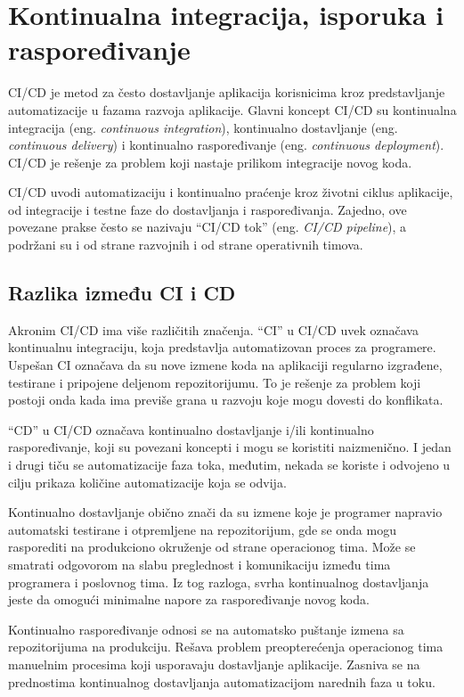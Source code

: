 \section{Kontinualna integracija, isporuka i raspoređivanje}\label{sec:arhitektura-ci_cd}

CI/CD je metod za često dostavljanje aplikacija korisnicima kroz predstavljanje automatizacije u 
fazama razvoja aplikacije. Glavni koncept CI/CD su kontinualna integracija (eng. 
\textit{continuous integration}), kontinualno dostavljanje (eng. \textit{continuous delivery}) i 
kontinualno raspoređivanje (eng. \textit{continuous deployment}). CI/CD je rešenje za problem 
koji nastaje prilikom integracije novog koda.

CI/CD uvodi automatizaciju i kontinualno praćenje kroz životni ciklus aplikacije, 
od integracije i testne faze do dostavljanja i raspoređivanja. Zajedno, ove povezane prakse 
često se nazivaju “CI/CD tok” (eng. \textit{CI/CD pipeline}), a podržani su i od strane razvojnih 
i od strane operativnih timova.

\subsection{Razlika između CI i CD}
Akronim CI/CD ima više različitih značenja. “CI” u CI/CD uvek označava kontinualnu integraciju, 
koja predstavlja automatizovan proces za programere. Uspešan CI označava da su nove izmene koda 
na aplikaciji regularno izgrađene, testirane i pripojene deljenom repozitorijumu. To je rešenje 
za problem koji postoji onda kada ima previše grana u razvoju koje mogu dovesti do konflikata.

“CD” u CI/CD označava kontinualno dostavljanje i/ili kontinualno raspoređivanje, koji su povezani 
koncepti i mogu se koristiti naizmenično. I jedan i drugi tiču se automatizacije faza toka, međutim, 
nekada se koriste i odvojeno u cilju prikaza količine automatizacije koja se odvija.

Kontinualno dostavljanje obično znači da su izmene koje je programer napravio automatski testirane 
i otpremljene na repozitorijum, gde se onda mogu rasporediti na produkciono okruženje od strane 
operacionog tima. Može se smatrati odgovorom na slabu preglednost i komunikaciju između tima 
programera i poslovnog tima. Iz tog razloga, svrha kontinualnog dostavljanja jeste da omogući 
minimalne napore za raspoređivanje novog koda.

Kontinualno raspoređivanje odnosi se na automatsko puštanje izmena sa repozitorijuma na produkciju. 
Rešava problem preopterećenja operacionog tima manuelnim procesima koji usporavaju dostavljanje 
aplikacije. Zasniva se na prednostima kontinualnog dostavljanja automatizacijom narednih faza u toku.

